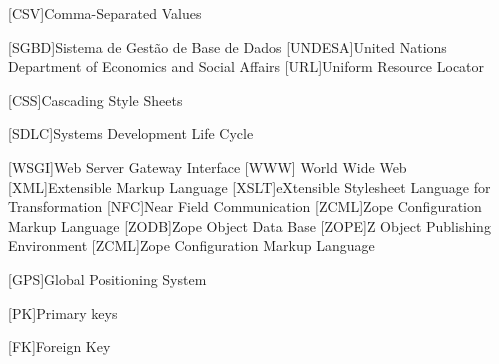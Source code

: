 \begin{acronym}[RELAX NG]
	[CSV]{Comma-Separated Values}
	
	[SGBD]{Sistema de Gestão de Base de Dados}
	[UNDESA]{United Nations Department of Economics and Social Affairs}
	[URL]{Uniform Resource Locator}
	
	[CSS]{Cascading Style Sheets}
	
	[SDLC]{Systems Development Life Cycle}
	
	[WSGI]{Web Server Gateway Interface}
	[WWW]{ World Wide Web}
	[XML]{Extensible Markup Language}
	[XSLT]{eXtensible Stylesheet Language for Transformation}
	[NFC]{Near Field Communication}
	[ZCML]{Zope Configuration Markup Language}
	[ZODB]{Zope Object Data Base}
	[ZOPE]{Z Object Publishing Environment}
	[ZCML]{Zope Configuration Markup Language}
	
	[GPS]{Global Positioning System}
	
	
	[PK]{Primary keys}
	
	[FK]{Foreign Key}
		
	
\end{acronym}